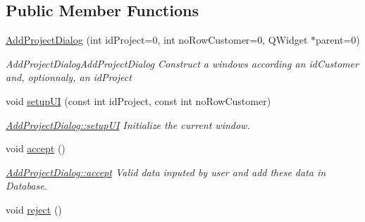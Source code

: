 \subsection*{Public Member Functions}
\begin{DoxyCompactItemize}
\item 
\hyperlink{classGui_1_1Dialogs_1_1AddProjectDialog_a73e81dfba4038bfd8d697c012a8a2d97}{Add\-Project\-Dialog} (int id\-Project=0, int no\-Row\-Customer=0, Q\-Widget $\ast$parent=0)
\begin{DoxyCompactList}\small\item\em Add\-Project\-Dialog\-Add\-Project\-Dialog Construct a windows according an {\itshape id\-Customer} and, optionnaly, an {\itshape id\-Project} \end{DoxyCompactList}\item 
\hypertarget{classGui_1_1Dialogs_1_1AddProjectDialog_abfa8eb0a2a03b08fc14c12e425737a62}{void \hyperlink{classGui_1_1Dialogs_1_1AddProjectDialog_abfa8eb0a2a03b08fc14c12e425737a62}{setup\-U\-I} (const int id\-Project, const int no\-Row\-Customer)}\label{classGui_1_1Dialogs_1_1AddProjectDialog_abfa8eb0a2a03b08fc14c12e425737a62}

\begin{DoxyCompactList}\small\item\em \hyperlink{classGui_1_1Dialogs_1_1AddProjectDialog_abfa8eb0a2a03b08fc14c12e425737a62}{Add\-Project\-Dialog\-::setup\-U\-I} Initialize the current window. \end{DoxyCompactList}\item 
\hypertarget{classGui_1_1Dialogs_1_1AddProjectDialog_abe345ededea4911846a44b984cc04f18}{void \hyperlink{classGui_1_1Dialogs_1_1AddProjectDialog_abe345ededea4911846a44b984cc04f18}{accept} ()}\label{classGui_1_1Dialogs_1_1AddProjectDialog_abe345ededea4911846a44b984cc04f18}

\begin{DoxyCompactList}\small\item\em \hyperlink{classGui_1_1Dialogs_1_1AddProjectDialog_abe345ededea4911846a44b984cc04f18}{Add\-Project\-Dialog\-::accept} Valid data inputed by user and add these data in Database. \end{DoxyCompactList}\item 
\hypertarget{classGui_1_1Dialogs_1_1AddProjectDialog_a767dcea1ae96d2efc3085f8ade4406ce}{void \hyperlink{classGui_1_1Dialogs_1_1AddProjectDialog_a767dcea1ae96d2efc3085f8ade4406ce}{reject} ()}\label{classGui_1_1Dialogs_1_1AddProjectDialog_a767dcea1ae96d2efc3085f8ade4406ce}


\end{DoxyCompactItemize}
